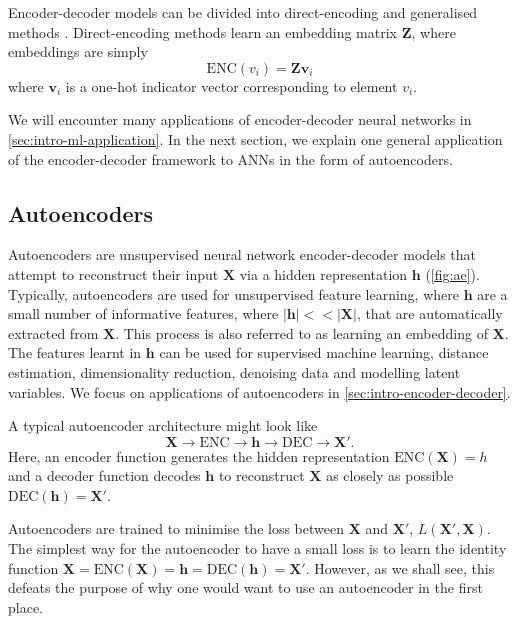 Encoder-decoder models can be divided into direct-encoding and generalised methods \cite{Hamilton2017}. Direct-encoding methods learn an embedding matrix $\mathbf{Z}$, where embeddings are simply
\[
\text{ENC}(v_i) = \mathbf{Zv}_i
\]
where $\mathbf{v}_i$ is a one-hot indicator vector corresponding to element $v_i$.

We will encounter many applications of encoder-decoder neural networks in \ref{sec:intro-ml-application}. In the next section, we explain one general application of the encoder-decoder framework to ANNs in the form of autoencoders.

\subsection{Autoencoders}

Autoencoders are unsupervised neural network encoder-decoder models that attempt to reconstruct their input $\mathbf{X}$ via a hidden representation $\mathbf{h}$ (\ref{fig:ae}). Typically, autoencoders are used for unsupervised feature learning, where $\mathbf{h}$ are a small number of informative features, where $|\mathbf{h}| << |\mathbf{X}|$, that are automatically extracted from $\mathbf{X}$. This process is also referred to as learning an embedding of $\mathbf{X}$. The features learnt in $\mathbf{h}$ can be used for supervised machine learning, distance estimation, dimensionality reduction, denoising data and modelling latent variables. We focus on applications of autoencoders in \ref{sec:intro-encoder-decoder}.

A typical autoencoder architecture might look like
\[
\mathbf{X} \rightarrow \text{ENC} \rightarrow \mathbf{h} \rightarrow \text{DEC} \rightarrow \mathbf{X}'.
\]
Here, an encoder function generates the hidden representation $\text{ENC}(\mathbf{X}) = h$ and a decoder function decodes $\mathbf{h}$ to reconstruct $\mathbf{X}$ as closely as possible $\text{DEC}(\mathbf{h}) = \mathbf{X}'$.

Autoencoders are trained to minimise the loss between $\mathbf{X}$ and $\mathbf{X}'$, $L(\mathbf{X}', \mathbf{X})$. The simplest way for the autoencoder to have a small loss is to learn the identity function $\mathbf{X} = \text{ENC}(\mathbf{X}) = \mathbf{h} = \text{DEC}(\mathbf{h}) = \mathbf{X}'$. However, as we shall see, this defeats the purpose of why one would want to use an autoencoder in the first place.

